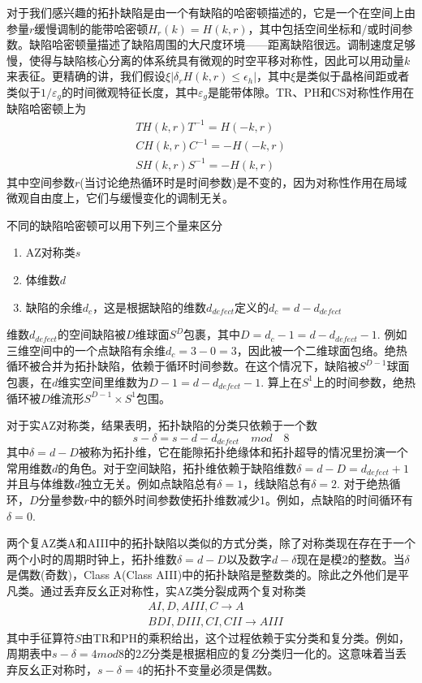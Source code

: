 \documentclass[a4paper]{article}
\numberwithin{equation}{subsection}
\begin{document}
对于我们感兴趣的拓扑缺陷是由一个有缺陷的哈密顿描述的，它是一个在空间上由参量$r$缓慢调制的能带哈密顿$H_{r}(k)=H(k,r)$，其中包括空间坐标和/或时间参数。缺陷哈密顿量描述了缺陷周围的大尺度环境——距离缺陷很远。调制速度足够慢，使得与缺陷核心分离的体系统具有微观的时空平移对称性，因此可以用动量$k$来表征。更精确的讲，我们假设$\xi|\delta_rH(k,r)\leq \epsilon_h|$，其中$\xi$是类似于晶格间距或者类似于$1/\varepsilon_g$的时间微观特征长度，其中$\varepsilon_g$是能带体隙。TR、PH和CS对称性作用在缺陷哈密顿上为
\begin{equation}
    \begin{split}
        TH(k,r)T^{-1}=H(-k,r)\\
        CH(k,r)C^{-1}=-H(-k,r)\\
        SH(k,r)S^{-1}=-H(k,r)
    \end{split}
\end{equation}
其中空间参数$r$(当讨论绝热循环时是时间参数)是不变的，因为对称性作用在局域微观自由度上，它们与缓慢变化的调制无关。

不同的缺陷哈密顿可以用下列三个量来区分
\begin{enumerate}
    \item AZ对称类$s$
    \item 体维数$d$
    \item 缺陷的余维$d_c$，这是根据缺陷的维数$d_{defect}$定义的$d_c=d-d_{defect}$
\end{enumerate}
维数$d_{defect}$的空间缺陷被$D$维球面$S^{D}$包裹，其中$D=d_c-1=d-d_{defect}-1$. 例如三维空间中的一个点缺陷有余维$d_c=3-0=3$，因此被一个二维球面包络。绝热循环被合并为拓扑缺陷，依赖于循环时间参数。在这个情况下，缺陷被$S^{D-1}$球面包裹，在$d$维实空间里维数为$D-1=d-d_{defect}-1$. 算上在$S^1$上的时间参数，绝热循环被$D$维流形$S^{D-1}\times S^1$包围。

对于实AZ对称类，结果表明，拓扑缺陷的分类只依赖于一个数
\begin{equation}
    s-\delta=s-d-d_{defect}\quad mod\quad 8
\end{equation}
其中$\delta=d-D$被称为拓扑维，它在能隙拓扑绝缘体和拓扑超导的情况里扮演一个常用维数$d$的角色。对于空间缺陷，拓扑维依赖于缺陷维数$\delta=d-D=d_{defect}+1$并且与体维数$d$独立无关。例如点缺陷总有$\delta=1$，线缺陷总有$\delta=2$. 对于绝热循环，$D$分量参数$r$中的额外时间参数使拓扑维数减少1。例如，点缺陷的时间循环有$\delta=0$. 

两个复AZ类A和AIII中的拓扑缺陷以类似的方式分类，除了对称类现在存在于一个两个小时的周期时钟上，拓扑维数$\delta=d−D$以及数字$d−\delta$现在是模$2$的整数。当$\delta$是偶数(奇数)，Class A(Class AIII)中的拓扑缺陷是整数类的。除此之外他们是平凡类。通过丢弃反幺正对称性，实AZ类分裂成两个复对称类
\begin{equation}
    \begin{split}
        &AI,D,AIII,C\rightarrow A\\
        &BDI,DIII,CI,CII\rightarrow AIII
    \end{split}
\end{equation}
其中手征算符$S$由TR和PH的乘积给出，这个过程依赖于实分类和复分类。例如，周期表中$s-\delta=4mod8$的$2Z$分类是根据相应的复$Z$分类归一化的。这意味着当丢弃反幺正对称时，$s−\delta=4$的拓扑不变量必须是偶数。
\end{document}
